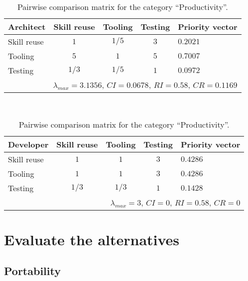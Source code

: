 \begin{table}[h]
    \begin{center}
        \begin{tabular}{lcccl}
            \hline
            \textbf{Architect} & Skill reuse & Tooling & Testing & Priority vector \\
            \hline
            Skill reuse        & $1$         & $1/5$   & $3$     & $0.2021$        \\
            Tooling            & $5$         & $1$     & $5$     & $0.7007$        \\
            Testing            & $1/3$       & $1/5$   & $1$     & $0.0972$        \\
            \hline
            \multicolumn{5}{r}{$\lambda_{max} = 3.1356$, $CI = 0.0678$, $RI = 0.58$, $CR = 0.1169$}\\
            \hline
        \end{tabular}
        \\\vspace{1em}
        \begin{tabular}{lcccl}
            \hline
            \textbf{Developer} & Skill reuse & Tooling & Testing & Priority vector \\
            \hline
            Skill reuse        & $1$         & $1$     & $3$     & $0.4286$        \\
            Tooling            & $1$         & $1$     & $3$     & $0.4286$        \\
            Testing            & $1/3$       & $1/3$   & $1$     & $0.1428$        \\
            \hline
            \multicolumn{5}{r}{$\lambda_{max} = 3$, $CI = 0$, $RI = 0.58$, $CR = 0$}               \\
            \hline
        \end{tabular}
        \caption{Pairwise comparison matrix for the category ``Productivity''.}
        \label{tab:productivity}
    \end{center}
\end{table}

\section{Evaluate the alternatives}


\subsection{Portability}


